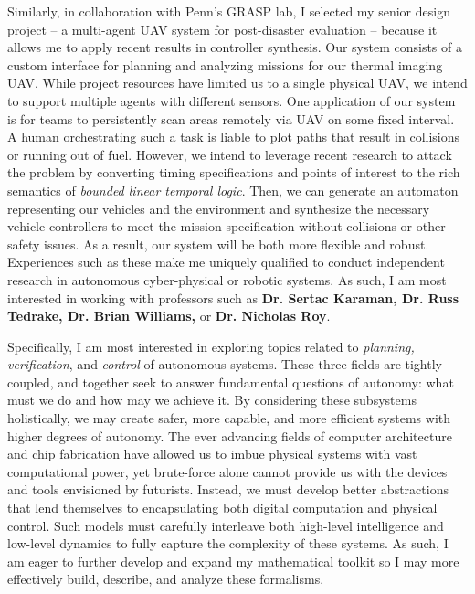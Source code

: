 \documentclass[]{letter}
\begin{document}
Similarly, in collaboration with Penn's GRASP lab, I selected my senior design project -- a multi-agent UAV system for post-disaster evaluation -- because it allows me to apply recent results in controller synthesis. Our system consists of a custom interface for planning and analyzing missions for our thermal imaging UAV. While project resources have limited us to a single physical UAV, we intend to support multiple agents with different sensors. One application of our system is for teams to persistently scan areas remotely via UAV on some fixed interval. A human orchestrating such a task is liable to plot paths that result in collisions or running out of fuel. However, we intend to leverage recent research to attack the problem by converting timing specifications and points of interest to the rich semantics of \emph{bounded linear temporal logic}. Then, we can generate an automaton representing our vehicles and the environment and synthesize the necessary vehicle controllers to meet the mission specification without collisions or other safety issues. As a result, our system will be both more flexible and robust. Experiences such as these make me uniquely qualified to conduct independent research in autonomous cyber-physical or robotic systems. As such, I am most interested in working with professors such as {\bf{Dr. Sertac Karaman, Dr. Russ Tedrake, Dr. Brian Williams,}} or {\bfseries{Dr. Nicholas Roy}}.

Specifically, I am most interested in exploring topics related to \emph{planning, verification}, and \emph{control} of autonomous systems. These three fields are tightly coupled, and together seek to answer fundamental questions of autonomy: what must we do and how may we achieve it. By considering these subsystems holistically, we may create safer, more capable, and more efficient systems with higher degrees of autonomy. The ever advancing fields of computer architecture and chip fabrication have allowed us to imbue physical systems with vast computational power, yet brute-force alone cannot provide us with the devices and tools envisioned by futurists. Instead, we must develop better abstractions that lend themselves to encapsulating both digital computation and physical control. Such models must carefully interleave both high-level intelligence and low-level dynamics to fully capture the complexity of these systems. As such, I am eager to further develop and expand my mathematical toolkit so I may more effectively build, describe, and analyze these formalisms.
\end{document}
